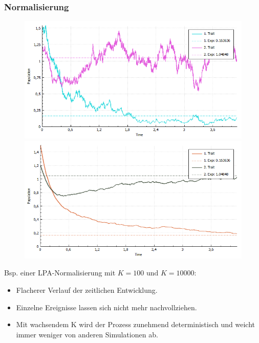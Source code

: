 \documentclass{beamer}
\begin{document}
\begin{frame}
	\frametitle{Normalisierung}
\begin{minipage}{0.49\textwidth}
		\begin{figure}
		\centering		
		\includegraphics[width=1\linewidth]{./Pictures/LPANormalisierungK100}%
		\\\includegraphics[width=1\linewidth]{./Pictures/LPANormalisierungK10000}%
		\end{figure}
	\end{minipage}
	\begin{minipage}{0.49\textwidth}
		Bsp. einer LPA-Normalisierung mit $ K = 100 \text{ und } K = 10000 $:
		\begin{itemize}
			\item Flacherer Verlauf der zeitlichen Entwicklung.\pause
			\item Einzelne Ereignisse lassen sich nicht mehr nachvollziehen.\pause
			\item Mit wachsendem K wird der Prozess zunehmend deterministisch und weicht immer weniger von anderen Simulationen ab.
		\end{itemize}
	\begin{center}
	\end{center}
	\end{minipage}\\
\end{frame}
\end{document}
